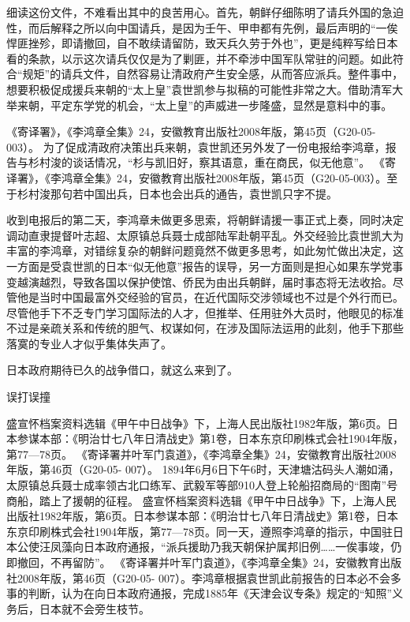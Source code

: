 \documentclass[12pt,UTF8]{ctexbook}
\begin{document}
细读这份文件，不难看出其中的良苦用心。首先，朝鲜仔细陈明了请兵外国的急迫性，而后解释之所以向中国请兵，是因为壬午、甲申都有先例，最后声明的“一俟悍匪挫殄，即请撤回，自不敢续请留防，致天兵久劳于外也”，更是纯粹写给日本看的条款，以示这次请兵仅仅是为了剿匪，并不牵涉中国军队常驻的问题。如此符合“规矩”的请兵文件，自然容易让清政府产生安全感，从而答应派兵。整件事中，想要积极促成援兵来朝的“太上皇”袁世凯参与拟稿的可能性非常之大。借助清军大举来朝，平定东学党的机会，“太上皇”的声威进一步隆盛，显然是意料中的事。

《寄译署》，《李鸿章全集》24，安徽教育出版社2008年版，第45页（G20-05-003）。
为了促成清政府决策出兵来朝，袁世凯还另外发了一份电报给李鸿章，报告与杉村浚的谈话情况，“杉与凯旧好，察其语意，重在商民，似无他意”。 《寄译署》，《李鸿章全集》24，安徽教育出版社2008年版，第45页（G20-05-003）。至于杉村浚那句若中国出兵，日本也会出兵的通告，袁世凯只字不提。

收到电报后的第二天，李鸿章未做更多思索，将朝鲜请援一事正式上奏，同时决定调动直隶提督叶志超、太原镇总兵聂士成部陆军赴朝平乱。外交经验比袁世凯大为丰富的李鸿章，对错综复杂的朝鲜问题竟然不做更多思考，如此匆忙做出决定，这一方面是受袁世凯的日本“似无他意”报告的误导，另一方面则是担心如果东学党事变越演越烈，导致各国以保护使馆、侨民为由出兵朝鲜，届时事态将无法收拾。尽管他是当时中国最富外交经验的官员，在近代国际交涉领域也不过是个外行而已。尽管他手下不乏专门学习国际法的人才，但推举、任用驻外大员时，他眼见的标准不过是亲疏关系和传统的胆气、权谋如何，在涉及国际法运用的此刻，他手下那些落寞的专业人才似乎集体失声了。

日本政府期待已久的战争借口，就这么来到了。

误打误撞

盛宣怀档案资料选辑《甲午中日战争》下，上海人民出版社1982年版，第6页。日本参谋本部：《明治廿七八年日清战史》第1卷，日本东京印刷株式会社1904年版，第77—78页。
《寄译署并叶军门袁道》，《李鸿章全集》24，安徽教育出版社2008年版，第46页（G20-05- 007）。
1894年6月6日下午6时，天津塘沽码头人潮如涌，太原镇总兵聂士成率领古北口练军、武毅军等部910人登上轮船招商局的“图南”号商船，踏上了援朝的征程。 盛宣怀档案资料选辑《甲午中日战争》下，上海人民出版社1982年版，第6页。日本参谋本部：《明治廿七八年日清战史》第1卷，日本东京印刷株式会社1904年版，第77—78页。同一天，遵照李鸿章的指示，中国驻日本公使汪凤藻向日本政府通报，“派兵援助乃我天朝保护属邦旧例……一俟事竣，仍即撤回，不再留防”。 《寄译署并叶军门袁道》，《李鸿章全集》24，安徽教育出版社2008年版，第46页（G20-05- 007）。李鸿章根据袁世凯此前报告的日本必不会多事的判断，认为在向日本政府通报，完成1885年《天津会议专条》规定的“知照”义务后，日本就不会旁生枝节。
\end{document}
